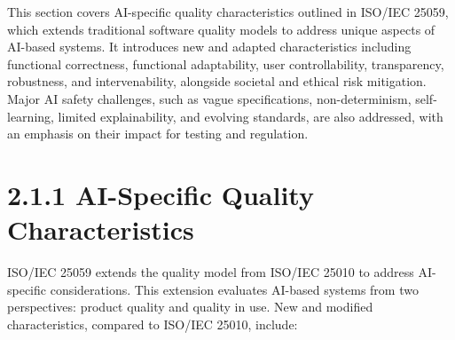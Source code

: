 \documentclass[
  letterpaper,
  DIV=11,
  numbers=noendperiod,
  oneside]{scrreprt}
\begin{document}
\begin{tcolorbox}
This section covers AI-specific quality characteristics outlined in
ISO/IEC 25059, which extends traditional software quality models to
address unique aspects of AI-based systems. It introduces new and
adapted characteristics including functional correctness, functional
adaptability, user controllability, transparency, robustness, and
intervenability, alongside societal and ethical risk mitigation. Major
AI safety challenges, such as vague specifications, non-determinism,
self-learning, limited explainability, and evolving standards, are also
addressed, with an emphasis on their impact for testing and regulation.

\section{2.1.1 AI-Specific Quality
Characteristics}\label{ai-specific-quality-characteristics-1}

ISO/IEC 25059 extends the quality model from ISO/IEC 25010 to address
AI-specific considerations. This extension evaluates AI-based systems
from two perspectives: product quality and quality in use. New and
modified characteristics, compared to ISO/IEC 25010, include:


\end{tcolorbox}
\end{document}
